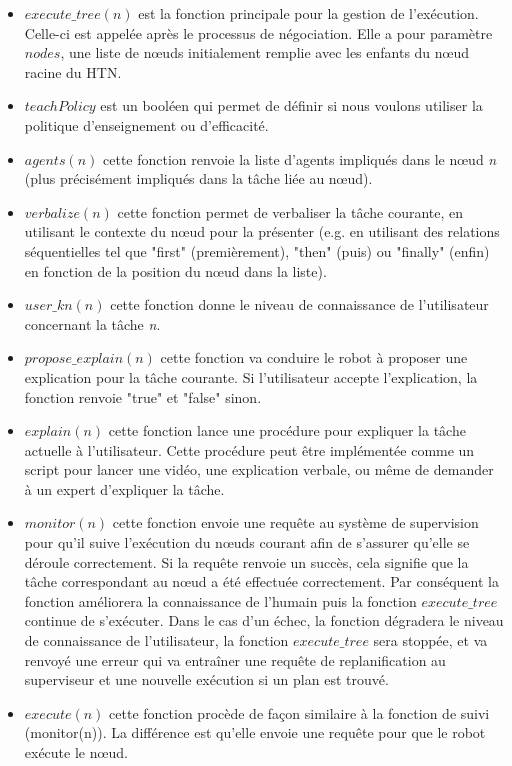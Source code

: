 \documentclass[a4paper,11pt,twoside]{StyleThese}
\begin{document}
\begin{itemize}
\item \textit{$execute\_tree(n)$} est la fonction principale pour la gestion de l'exécution. Celle-ci est appelée après le processus de négociation. Elle a pour paramètre \textit{$nodes$}, une liste de nœuds initialement remplie avec les  enfants du nœud racine du HTN.
\item \textit{$teachPolicy$} est un booléen qui permet de définir si nous voulons utiliser la politique d'enseignement ou d'efficacité.
\item \textit{$agents(n)$} cette fonction renvoie la liste d'agents impliqués dans le nœud \textit{n} (plus précisément impliqués dans la tâche liée au nœud).
\item \textit{$verbalize(n)$} cette fonction permet de verbaliser la tâche courante, en utilisant le contexte du nœud pour la présenter (e.g. en utilisant des relations séquentielles tel que "first" (premièrement), "then" (puis) ou "finally" (enfin) en fonction de la position du nœud dans la liste).
\item \textit{$user\_kn(n)$} cette fonction donne le niveau de connaissance de l'utilisateur concernant la tâche \textit{n}.
\item \textit{$propose\_explain(n)$} cette fonction va conduire le robot à proposer une explication pour la tâche courante. Si l'utilisateur accepte l'explication, la fonction renvoie "true" et "false" sinon.
\item \textit{$explain(n)$} cette fonction lance une procédure pour expliquer la tâche actuelle à l'utilisateur. Cette procédure peut être implémentée comme un script pour lancer une vidéo, une explication verbale, ou même de demander à un expert d'expliquer la tâche.
\item \textit{$monitor(n)$} cette fonction envoie une requête au système de supervision pour qu'il suive l'exécution du nœuds courant afin de s'assurer qu'elle se déroule correctement. Si la requête renvoie un succès, cela signifie que la tâche correspondant au nœud a été effectuée correctement. Par conséquent la fonction améliorera la connaissance de l'humain puis la fonction \textit{$execute\_tree$} continue de s'exécuter. Dans le cas d'un échec, la fonction dégradera le niveau de connaissance de l'utilisateur, la fonction \textit{$execute\_tree$} sera stoppée, et va renvoyé une erreur qui va entraîner une requête de replanification au superviseur et une nouvelle exécution si un plan est trouvé.
\item \textit{$execute(n)$} cette fonction procède de façon similaire à la fonction de suivi (monitor(n)). La différence est qu'elle envoie une requête pour que le robot exécute le nœud.
\end{itemize}
 
\end{document}
